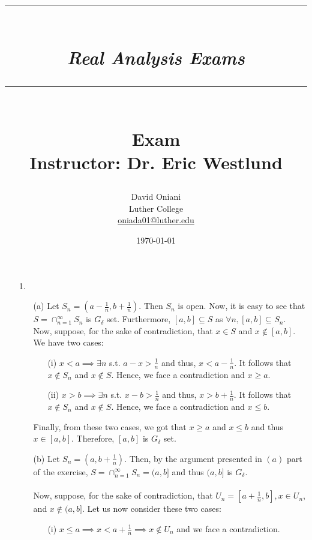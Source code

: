 \documentclass[11pt]{article}
\author{David Oniani\\
        Luther College\\
        \href{mailto:oniada01@luther.edu}{oniada01@luther.edu}}
\title{\rule{\paperwidth - 150pt}{1pt}\textbf{\\\textit{Real Analysis
Exams}\\}\rule {\paperwidth - 150pt}{1pt}\\\textbf{Exam
\textnumero2}\\{\normalsize Instructor: Dr. Eric Westlund}}
\date{\today}
\begin{document}
\maketitle


\begin{itemize}
    \item[1.]
        \begin{itemize}
            \item[(a)]
                Let $S_n = (a - \frac{1}{n}, b + \frac{1}{n})$. Then $S_n$ is
                open. Now, it is easy to see that $S = \cap_{n = 1}^{\infty}
                S_n$ is $G_\delta$ set. Furthermore, $[a, b] \subseteq S$ as
                $\forall n, [a, b] \subseteq S_n$. Now, suppose, for the sake
                of contradiction, that $x \in S$ and $x \notin [a, b]$. We have
                two cases:
                \begin{itemize}
                    \item[(i)]
                        $x < a \implies \exists n$ s.t. $a - x > \frac{1}{n}$
                        and thus, $x < a - \frac{1}{n}$. It follows that $x
                        \notin S_n$ and $x \notin S$. Hence, we face a
                        contradiction and $x \geq a$.

                    \item[(ii)]
                        $x > b \implies \exists n$ s.t. $x - b > \frac{1}{n}$
                        and thus, $x > b + \frac{1}{n}$. It follows that $x
                        \notin S_n$ and $x \notin S$. Hence, we face a
                        contradiction and $x \leq b$.
                \end{itemize}
                Finally, from these two cases, we got that $x \geq a$ and $x
                \leq b$ and thus $x \in [a, b]$. Therefore, $[a, b]$ is
                $G_\delta$ set.

            \item[(b)]
                Let $S_n = (a, b + \frac{1}{n})$. Then, by the argument
                presented in $(a)$ part of the exercise, $S = \cap_{n =
                1}^{\infty} S_n = (a, b]$ and thus $(a, b]$ is $G_\delta$.
                \\
                \\
                Now, suppose, for the sake of contradiction, that $U_n = [a +
                \frac{1}{n}, b], x \in U_n$, and $ x \notin (a, b]$. Let us now
                consider these two cases:
                \begin{itemize}
                    \item[(i)]
                        $x \leq a \implies x < a + \frac{1}{n} \implies x
                        \notin U_n$ and we face a contradiction.


\end{itemize}
\end{itemize}
\end{itemize}
\end{document}
